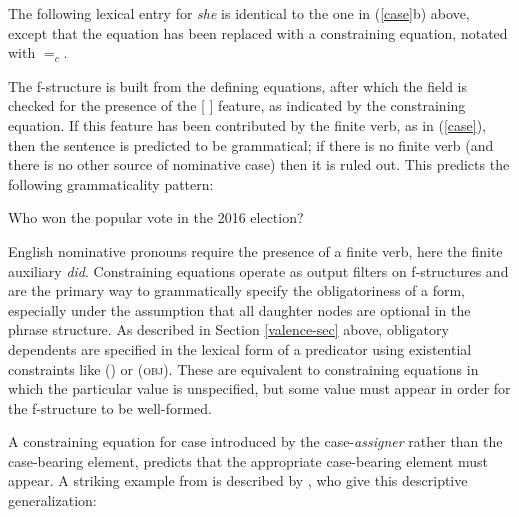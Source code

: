 The following lexical entry for \textit{she} is identical to the one in (\ref{case}b) above, except that the  equation has been replaced with a constraining equation, notated with $=_c$.  

\ea
\label{constrain}
{\qquad{} }
\z
The f-structure is built from the defining equations, after which the \subj{} field is checked for the presence of the [ ] feature, as indicated by the constraining equation.  If this feature has been contributed by the finite verb, as in (\ref{case}), then the sentence is predicted to be grammatical; if there is no finite verb (and there is no other source of nominative case) then it is ruled out.  This predicts the following grammaticality pattern:

\begin{exe}
\ex  Who won the popular vote in the 2016 election? 
\label{she}
\begin{xlist}
\end{xlist}
\end{exe}
English nominative pronouns require the presence of a finite verb, here the finite auxiliary \textit{did}.  Constraining equations operate as output filters on f-structures and are the primary way to grammatically specify the obligatoriness of a form, especially under the assumption that all daughter nodes are optional in the phrase structure.  As described in Section \ref{valence-sec} above, obligatory dependents are specified in the lexical form of a predicator using existential constraints like (\up \subj) or (\up \textsc{obj}).  These are equivalent to constraining equations in which the particular value is unspecified, but some value must appear in order for the f-structure to be well-formed.  

A constraining equation for case  introduced by the case-\textit{assigner} rather than the case-bearing element, predicts that the appropriate case-bearing element must appear.  A striking example from  is described by \citet[134]{WZ2003a}, who give this descriptive generalization:

